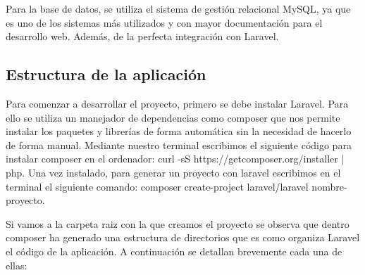 \vspace{5 mm}

Para la base de datos, se utiliza el sistema de gestión relacional MySQL, ya que es uno de los sistemas más utilizados y con mayor documentación para el desarrollo web. Además, de la perfecta integración con Laravel.

\subsection{Estructura de la aplicación}

Para comenzar a desarrollar el proyecto, primero se debe instalar Laravel. Para ello se utiliza un manejador de dependencias como composer que nos permite instalar los paquetes y librerías de forma automática sin la necesidad de hacerlo de forma manual. Mediante nuestro terminal escribimos el siguiente código para instalar composer en el ordenador: curl -sS https://getcomposer.org/installer | php. Una vez instalado, para generar un proyecto con laravel escribimos en el terminal el siguiente comando: composer create-project laravel/laravel nombre-proyecto.

\vspace{5 mm}


Si vamos a la carpeta raiz con la que creamos el proyecto se observa que dentro composer ha generado una estructura de directorios que es como organiza Laravel el código de la aplicación. A continuación se detallan brevemente cada una de ellas:


